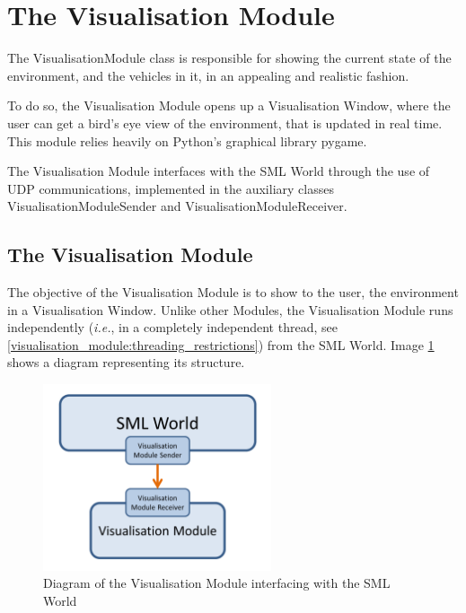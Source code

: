 
\section{The Visualisation Module}
\label{sec:the_visualisation_module}

The VisualisationModule class is responsible for showing the current state of the environment, and the vehicles in it, in an appealing and realistic fashion.

To do so, the Visualisation Module opens up a Visualisation Window, where the user can get a bird's eye view of the environment, that is updated in real time. This module relies heavily on Python's graphical library pygame.

The Visualisation Module interfaces with the SML World through the use of UDP communications, implemented in the auxiliary classes VisualisationModuleSender and VisualisationModuleReceiver.

\subsection{The Visualisation Module}

The objective of the Visualisation Module is to show to the user, the environment in a Visualisation Window. Unlike other Modules, the Visualisation Module runs independently (\textit{i.e.}, in a completely independent thread, see \ref{visualisation_module:threading_restrictions}) from the SML World. Image \ref{fig:visualisation_module_diagram} shows a diagram representing its structure.

\begin{figure}[h!]
  \centering
    \includegraphics[width=0.6\textwidth]{visualisation_module_diagram}
    \caption{Diagram of the Visualisation Module interfacing with the SML World \label{fig:visualisation_module_diagram} }
\end{figure}

